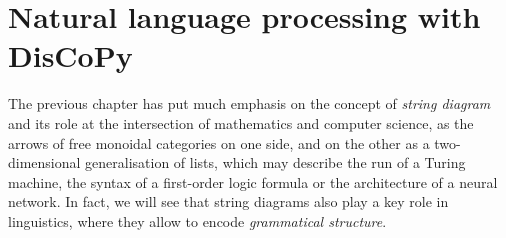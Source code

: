 
\section{Natural language processing with DisCoPy}\label{section:NLP}

The previous chapter has put much emphasis on the concept of \emph{string diagram} and its role at the intersection of mathematics and computer science, as the arrows of free monoidal categories on one side, and on the other as a two-dimensional generalisation of lists, which may describe the run of a Turing machine, the syntax of a first-order logic formula or the architecture of a neural network.
In fact, we will see that string diagrams also play a key role in linguistics, where they allow to encode \emph{grammatical structure}.


%
%
%
%
